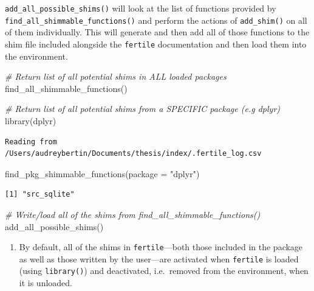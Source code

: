 \documentclass[12pt,twoside]{reedthesis}
\newenvironment{Shaded}{\begin{snugshade}}{\end{snugshade}}
\newcommand{\AttributeTok}[1]{\textcolor[rgb]{0.77,0.63,0.00}{#1}}
\newcommand{\CommentTok}[1]{\textcolor[rgb]{0.56,0.35,0.01}{\textit{#1}}}
\newcommand{\FunctionTok}[1]{\textcolor[rgb]{0.00,0.00,0.00}{#1}}
\newcommand{\NormalTok}[1]{#1}
\newcommand{\StringTok}[1]{\textcolor[rgb]{0.31,0.60,0.02}{#1}}
\providecommand{\tightlist}{%
  \setlength{\itemsep}{0pt}\setlength{\parskip}{0pt}}
\begin{document}
\texttt{add\_all\_possible\_shims()} will look at the list of functions provided by \texttt{find\_all\_shimmable\_functions()} and perform the actions of \texttt{add\_shim()} on all of them individually. This will generate and then add all of those functions to the shim file included alongside the \texttt{fertile} documentation and then load them into the environment.
\begin{Shaded}
\begin{Highlighting}[]
\CommentTok{\# Return list of all potential shims in ALL loaded packages}
\FunctionTok{find\_all\_shimmable\_functions}\NormalTok{()}
\end{Highlighting}
\end{Shaded}
\begin{Shaded}
\begin{Highlighting}[]
\CommentTok{\# Return list of all potential shims from a SPECIFIC package (e.g dplyr)}
\FunctionTok{library}\NormalTok{(dplyr)}
\end{Highlighting}
\end{Shaded}
\begin{verbatim}
Reading from /Users/audreybertin/Documents/thesis/index/.fertile_log.csv
\end{verbatim}
\begin{Shaded}
\begin{Highlighting}[]
\FunctionTok{find\_pkg\_shimmable\_functions}\NormalTok{(}\AttributeTok{package =} \StringTok{"dplyr"}\NormalTok{)}
\end{Highlighting}
\end{Shaded}
\begin{verbatim}
[1] "src_sqlite"
\end{verbatim}
\begin{Shaded}
\begin{Highlighting}[]
\CommentTok{\# Write/load all of the shims from find\_all\_shimmable\_functions()}
\FunctionTok{add\_all\_possible\_shims}\NormalTok{()}
\end{Highlighting}
\end{Shaded}
\begin{enumerate}
\def\labelenumi{\arabic{enumi}.}
\setcounter{enumi}{2}
\tightlist
\item
  By default, all of the shims in \texttt{fertile}---both those included in the package as well as those written by the user---are activated when \texttt{fertile} is loaded (using \texttt{library()}) and deactivated, i.e.~removed from the environment, when it is unloaded.
\end{enumerate}
\end{document}
